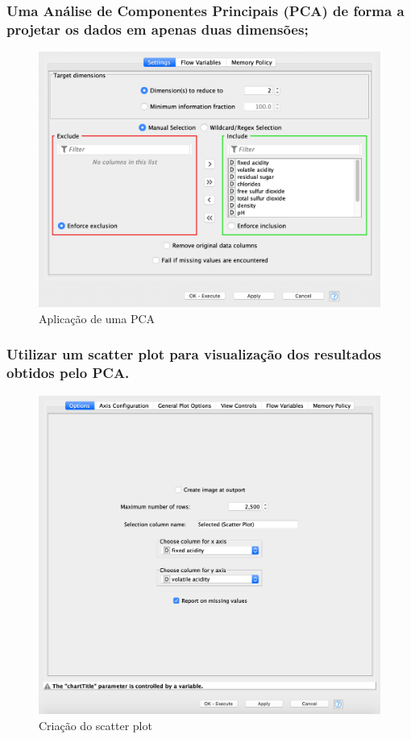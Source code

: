 \documentclass{article}
\begin{document}
\subsubsection{Uma Análise de Componentes Principais (PCA) de forma a projetar os dados em
apenas duas dimensões;}

\begin{figure}[H]
    \centering
    \includegraphics[scale=0.4]{Images/T3_a.png}
    \caption{Aplicação de uma PCA}
\end{figure}

\subsubsection{Utilizar um scatter plot para visualização dos resultados obtidos pelo PCA.}

\begin{figure}[H]
    \centering
    \includegraphics[scale=0.2]{Images/T3_b1.png}
    \caption{Criação do scatter plot}
\end{figure}
\end{document}
